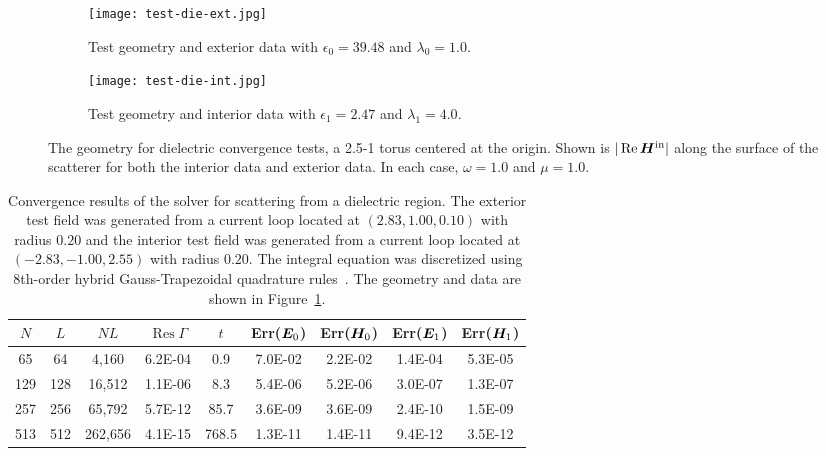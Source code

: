 \documentclass[11pt]{article}
\DeclareMathOperator{\Res}{Res}
\DeclareMathOperator{\realpart}{Re}
\newcommand{\vct}{\vectorsym}
\newcommand{\bE}{\vectorsym{E}}
\newcommand{\bH}{\vct{ H}}
\newcommand\bHin{\vct{H}^\textnormal{in}}
\numberwithin{equation}{section}
\begin{document}
\begin{figure}[!t]
  \centering
  \begin{subfigure}[b]{.45\linewidth}
    \centering
    \texttt{[image: test-die-ext.jpg]}
    \caption{Test geometry and exterior data with $\epsilon_0 =
      39.48$ and $\lambda_0=1.0$.}
  \end{subfigure}
  \hfill
  \begin{subfigure}[b]{.45\linewidth}
    \centering
    \texttt{[image: test-die-int.jpg]}
    \caption{Test geometry and interior data with $\epsilon_1 =
      2.47$ and $\lambda_1=4.0$.}
  \end{subfigure}
  \caption{The geometry for dielectric convergence tests, a 2.5-1 torus
    centered at the origin. Shown is $|\realpart \bHin|$ along the surface
    of the scatterer for both the interior data and exterior data. In
    each case, $\omega = 1.0$ and $\mu=1.0$.}
  \label{fig_testgeo2}
\end{figure}

\begin{table}[!b]
   \begin{center}
      \caption{Convergence results of the solver for scattering from a
        dielectric region.  The exterior test field was generated from
        a current loop located at $(2.83, 1.00, 0.10)$ with radius
        $0.20$ and the interior test field was generated from a
        current loop located at $(-2.83, -1.00, 2.55)$ with radius
        $0.20$.  The integral equation was discretized using 8th-order
        hybrid Gauss-Trapezoidal quadrature rules~\cite{alpert}. The
        geometry and data are shown in Figure~\ref{fig_testgeo2}.}
      \label{tab_conv_die}
      \begin{tabular}{|c|c|c|c|c|c|c|c|c|} \hline
        $N$  &  $L$ & $NL$ & $\Res\Gamma$ & $t$ & Err($\bE_0$)
        & Err($\bH_0$)
        & Err($\bE_1$)
        & Err($\bH_1$) \\ \hline \hline
        65  &  64 & 4,160 & 6.2E-04 & 0.9  & 7.0E-02 & 2.2E-02 
        & 1.4E-04 & 5.3E-05\\ \hline
        129 & 128 & 16,512 & 1.1E-06 & 8.3  & 5.4E-06 & 5.2E-06 
        & 3.0E-07 & 1.3E-07 \\ \hline
        257 & 256 & 65,792 & 5.7E-12 & 85.7 & 3.6E-09 & 3.6E-09 
        & 2.4E-10 & 1.5E-09 \\ \hline
        513 & 512 & 262,656 & 4.1E-15 & 768.5 & 1.3E-11 & 1.4E-11 
        & 9.4E-12 & 3.5E-12 \\ \hline
      \end{tabular}
    \end{center}
\end{table}
\end{document}
